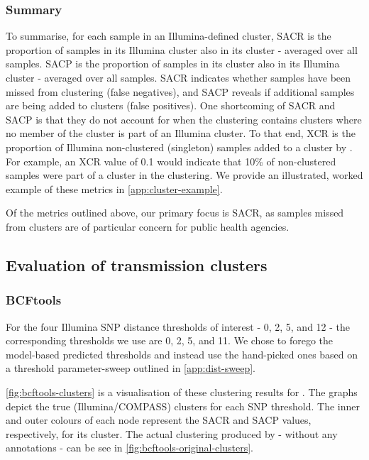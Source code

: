 \subsubsection{Summary}

To summarise, for each sample in an Illumina-defined cluster, SACR is the proportion of samples in its Illumina cluster also in its \ont{} cluster - averaged over all samples. SACP is the proportion of samples in its \ont{} cluster also in its Illumina cluster - averaged over all samples. SACR indicates whether samples have been missed from \ont{} clustering (false negatives), and SACP reveals if additional samples are being added to \ont{} clusters (false positives). One shortcoming of SACR and SACP is that they do not account for when the \ont{} clustering contains clusters where no member of the cluster is part of an Illumina cluster. To that end, XCR is the proportion of Illumina non-clustered (singleton) samples added to a cluster by \ont{}. For example, an XCR value of 0.1 would indicate that 10\% of non-clustered samples were part of a cluster in the \ont{} clustering. We provide an illustrated, worked example of these metrics in \autoref{app:cluster-example}.

Of the metrics outlined above, our primary focus is SACR, as samples missed from clusters are of particular concern for public health agencies.

\subsection{Evaluation of transmission clusters}
\label{sec:eval-clusters}

\subsubsection{BCFtools}
\label{sec:bcftools-clustering}

For the four Illumina SNP distance thresholds of interest - 0, 2, 5, and 12 - the corresponding \bcftools{} thresholds we use are 0, 2, 5, and 11. We chose to forego the model-based predicted thresholds and instead use the hand-picked ones based on a threshold parameter-sweep outlined in \autoref{app:dist-sweep}.

\autoref{fig:bcftools-clusters} is a visualisation of these clustering results for \bcftools{}. The graphs depict the true (Illumina/COMPASS) clusters for each SNP threshold. The inner and outer colours of each node represent the SACR and SACP values, respectively, for its cluster. The actual clustering produced by \bcftools{} - without any annotations - can be see in \autoref{fig:bcftools-original-clusters}.

